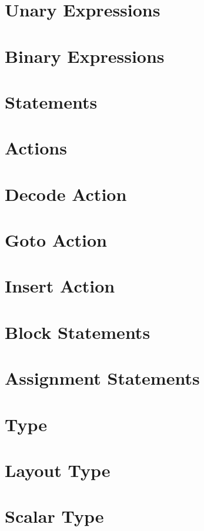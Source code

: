\section{Unary Expressions} \label{unary_expr_guide}

\section{Binary Expressions} \label{binary_expr_guide}

\section{Statements} \label{statements_guide}

\section{Actions} \label{action_guide}

\section{Decode Action} \label{decode_guide}

\section{Goto Action} \label{goto_guide}

\section{Insert Action} \label{insert_guide}

\section{Block Statements} \label{block_stmt_guide}

\section{Assignment Statements} \label{assign_stmt_guide}

\section{Type} \label{type_guide}

\section{Layout Type} \label{layout_type_guide}

\section{Scalar Type} \label{scalar_type_guide}
